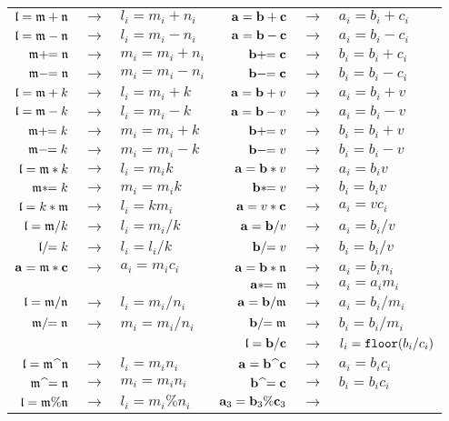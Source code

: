 \begin{table}
\begin{center}
\footnotesize
\begin{tabular}{|rcl|rcl|}
\hline
$\mathfrak{l}=\mathfrak{m}+\mathfrak{n}$ &$\to$& $l_i=m_i+n_i$ & $\mathbf{a}=\mathbf{b}+\mathbf{c}$ &$\to$& $a_i=b_i+c_i$  \\
$\mathfrak{l}=\mathfrak{m}-\mathfrak{n}$ &$\to$& $l_i=m_i-n_i$ & $\mathbf{a}=\mathbf{b}-\mathbf{c}$ &$\to$& $a_i=b_i-c_i$  \\
$\mathfrak{m}+\!\!=\mathfrak{n}$ &$\to$& $m_i=m_i+n_i$ & $\mathbf{b}+\!\!=\mathbf{c}$ &$\to$& $b_i=b_i+c_i$  \\
$\mathfrak{m}-\!\!=\mathfrak{n}$ &$\to$& $m_i=m_i-n_i$ & $\mathbf{b}-\!\!=\mathbf{c}$ &$\to$& $b_i=b_i-c_i$  \\
$ \mathfrak{l} = \mathfrak{m}+k$ &$\to$& $l_i = m_i+k$ & $\mathbf{a}=\mathbf{b}+v$ &$\to$& $a_i=b_i+v$ \\ 
$ \mathfrak{l} = \mathfrak{m}-k$ &$\to$& $l_i = m_i-k$ & $\mathbf{a}=\mathbf{b}-v$ &$\to$& $a_i=b_i-v$ \\ 
$ \mathfrak{m}+\!\!=k$ &$\to$& $m_i = m_i+k$ & $\mathbf{b}+\!\!=v$ &$\to$& $b_i=b_i+v$  \\ 
$ \mathfrak{m}-\!\!=k$ &$\to$& $m_i = m_i-k$ & $\mathbf{b}-\!\!=v$ &$\to$& $b_i=b_i-v$  \\ 
\hline
$\mathfrak{l}=\mathfrak{m}\ast k$ &$\to$& $l_i=m_i  k$ & $\mathbf{a}=\mathbf{b}\ast v$ &$\to$& $a_i=b_i  v$  \\
$\mathfrak{m}\ast\!\!= k$ &$\to$& $m_i=m_i  k$ & $\mathbf{b}\ast\!\!= v$ &$\to$& $b_i=b_i  v$  \\
$\mathfrak{l}= k \ast \mathfrak{m}$ &$\to$& $l_i=k  m_i$ & $\mathbf{a}= v \ast \mathbf{c}$ &$\to$& $a_i= v  c_i$  \\
$\mathfrak{l}=\mathfrak{m}/ k$ &$\to$& $l_i=m_i/ k$ & $\mathbf{a}=\mathbf{b}/ v$ &$\to$& $a_i=b_i/ v$  \\
$\mathfrak{l}/\!\!= k$ &$\to$& $l_i=l_i/ k$ & $\mathbf{b}/\!\!= v$ &$\to$& $b_i=b_i/ v$  \\
\hline
$\mathbf{a} = \mathfrak{m} \ast \mathbf{c}$ &$\to$& $a_i=m_i  c_i$ & $\mathbf{a} = \mathbf{b} \ast \mathfrak{n}$ &$\to$&
$a_i=b_i  n_i$ \\
&&& $\mathbf{a} \ast\!\!= \mathfrak{m}$ &$\to$& $a_i=a_i  m_i$ \\
$\mathfrak{l} = \mathfrak{m}/\mathfrak{n}$ &$\to$& $l_i=m_i/n_i$ & $\mathbf{a} = \mathbf{b} / \mathfrak{m}$ &$\to$& $a_i=b_i/ m_i$ \\
$\mathfrak{m}/\!\!=\mathfrak{n}$ &$\to$& $m_i=m_i/n_i$ & $ \mathbf{b} /\!\!= \mathfrak{m}$ &$\to$& $b_i=b_i/ m_i$ \\
&&& $\mathfrak{l}=\mathbf{b}/\mathbf{c}$ &$\to$& $l_i={\tt
  floor}(b_i/c_i)$ \\
$\mathfrak{l} = \mathfrak{m} \,\,\widehat{}\,\, \mathfrak{n}$ &$\to$& $l_i=m_in_i$ & $\mathbf{a} = \mathbf{b} \,\,\widehat{}\,\, \mathbf{c}$ &$\to$&
$a_i=b_ic_i$ \\
$\mathfrak{m} \,\,\widehat{}= \mathfrak{n}$ &$\to$& $m_i=m_in_i$ & $\mathbf{b} \,\,\widehat{}= \mathbf{c}$ &$\to$&
$b_i=b_ic_i$ \\
\hline
$\mathfrak{l} = \mathfrak{m} \% \mathfrak{n}$ &$\to$& $l_i=m_i\% n_i$ & $\mathbf{a}_3 = \mathbf{b}_3 \% \mathbf{c}_3$ &$\to$&

\end{tabular}
\end{center}
\end{table}

